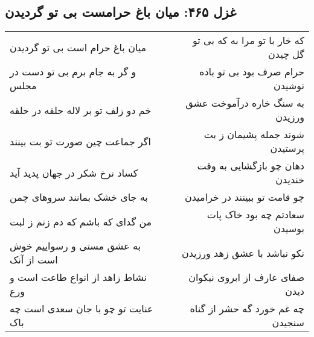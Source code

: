 \begin{center}
\section*{غزل ۴۶۵: میان باغ حرامست بی تو گردیدن}
\label{sec:465}
\begin{longtable}{l p{0.5cm} r}
میان باغ حرام است بی تو گردیدن
&&
که خار با تو مرا به که بی تو گل چیدن
\\
و گر به جام برم بی تو دست در مجلس
&&
حرام صرف بود بی تو باده نوشیدن
\\
خم دو زلف تو بر لاله حلقه در حلقه
&&
به سنگ خاره درآموخت عشق ورزیدن
\\
اگر جماعت چین صورت تو بت بینند
&&
شوند جمله پشیمان ز بت پرستیدن
\\
کساد نرخ شکر در جهان پدید آید
&&
دهان چو بازگشایی به وقت خندیدن
\\
به جای خشک بمانند سروهای چمن
&&
چو قامت تو ببینند در خرامیدن
\\
من گدای که باشم که دم زنم ز لبت
&&
سعادتم چه بود خاک پات بوسیدن
\\
به عشق مستی و رسواییم خوش است از آنک
&&
نکو نباشد با عشق زهد ورزیدن
\\
نشاط زاهد از انواع طاعت است و ورع
&&
صفای عارف از ابروی نیکوان دیدن
\\
عنایت تو چو با جان سعدی است چه باک
&&
چه غم خورد گه حشر از گناه سنجیدن
\\
\end{longtable}
\end{center}
